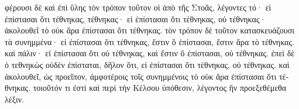 \begin{greek}
φέρουσι δὲ καὶ ἐπὶ ὕλης τὸν τρόπον τοῦτον οἱ ἀπὸ τῆς Στοᾶς, λέγοντες τό· εἰ ἐπίστασαι ὅτι τέθνηκας, τέθνηκας· εἰ ἐπίστασαι ὅτι τέθνηκας, οὐ τέθνηκας· ἀκολουθεῖ τὸ οὐκ ἄρα ἐπίστασαι ὅτι τέθνηκας. τὸν τρόπον δὲ τοῦτον κατασκευάζουσι τὰ συνημμένα· εἰ ἐπίστασαι ὅτι τέθνηκας, ἔστιν ὃ ἐπίστασαι, ἔστιν ἄρα τὸ τέθνηκας. καὶ πάλιν· εἰ ἐπίστασαι ὅτι οὐ τέθνηκας, καὶ ἔστιν ὃ ἐπίστασαι, οὐ τέθνηκας. ἐπεὶ δὲ ὁ τεθνηκὼς οὐδὲν ἐπίσταται, δῆλον ὅτι, εἰ ἐπίστασαι ὅτι τέθνηκας, οὐ τέθνηκας. καὶ ἀκολουθεῖ, ὡς προεῖπον, ἀμφοτέροις τοῖς συνημμένοις τὸ οὐκ ἄρα ἐπίστασαι ὅτι τέθνηκας. τοιοῦτόν τι ἐστὶ καὶ περὶ τὴν Κέλσου ὑπόθεσιν, λέγοντος ἣν προεξεθέμεθα λέξιν.

\end{greek}